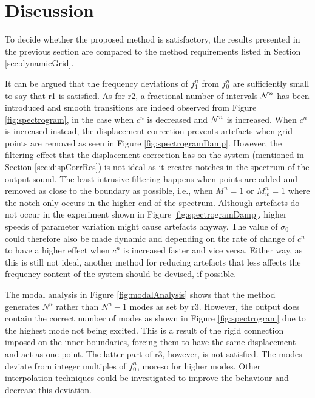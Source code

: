 \section{Discussion}\label{sec:discussion}
To decide whether the proposed method is satisfactory, the results presented in the previous section are compared to the method requirements listed in Section \ref{sec:dynamicGrid}.%

It can be argued that the frequency deviations of $f_1^n$ from $f_0^n$ are sufficiently small to say that r1 is satisfied. As for r2, a fractional number of intervals $\mathcal{N}^n$ has been introduced and smooth transitions are indeed observed from Figure \ref{fig:spectrogram}, in the case when $c^n$ is decreased and $\mathcal{N}^n$ is increased. When $c^n$ is increased instead, the displacement correction prevents artefacts when grid points are removed as seen in Figure \ref{fig:spectrogramDamp}. However, the filtering effect that the displacement correction has on the system (mentioned in Section \ref{sec:dispCorrRes}) is not ideal as it creates notches in the spectrum of the output sound. The least intrusive filtering happens when points are added and removed as close to the boundary as possible, i.e., when $M^n = 1$ or $M_w^n = 1$ where the notch only occurs in the higher end of the spectrum. Although artefacts do not occur in the experiment shown in Figure \ref{fig:spectrogramDamp}, higher speeds of parameter variation might cause artefacts anyway. The value of $\sigma_0$ could therefore also be made dynamic and depending on the rate of change of $c^n$ to have a higher effect when $c^n$ is increased faster and vice versa.
Either way, as this is still not ideal, another method for reducing artefacts that less affects the frequency content of the system should be devised, if possible. 

The modal analysis in Figure \ref{fig:modalAnalysis} shows that the method generates $N^n$ rather than $N^n - 1$ modes as set by r3. However, the output does contain the correct number of modes as shown in Figure \ref{fig:spectrogram} due to the highest mode not being excited. This is a result of the rigid connection imposed on the inner boundaries, forcing them to have the same displacement and act as one point. %
%
The latter part of r3, however, is not satisfied. The modes deviate from integer multiples of $f_0^n$, moreso for higher modes. Other interpolation techniques could be investigated to improve the behaviour and decrease this deviation.

